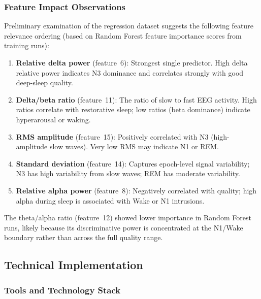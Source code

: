 \documentclass[10pt]{article}
\begin{document}
\subsubsection{Feature Impact Observations}
\label{sec:featureImpact}

Preliminary examination of the regression dataset suggests the following feature relevance ordering (based on Random Forest feature importance scores from training runs):

\begin{enumerate}
  \item \textbf{Relative delta power} (feature~6): Strongest single predictor. High delta relative power indicates N3 dominance and correlates strongly with good deep-sleep quality.
  \item \textbf{Delta/beta ratio} (feature~11): The ratio of slow to fast EEG activity. High ratios correlate with restorative sleep; low ratios (beta dominance) indicate hyperarousal or waking.
  \item \textbf{RMS amplitude} (feature~15): Positively correlated with N3 (high-amplitude slow waves). Very low RMS may indicate N1 or REM.
  \item \textbf{Standard deviation} (feature~14): Captures epoch-level signal variability; N3 has high variability from slow waves; REM has moderate variability.
  \item \textbf{Relative alpha power} (feature~8): Negatively correlated with quality; high alpha during sleep is associated with Wake or N1 intrusions.
\end{enumerate}

The theta/alpha ratio (feature~12) showed lower importance in Random Forest runs, likely because its discriminative power is concentrated at the N1/Wake boundary rather than across the full quality range.

\subsection{Technical Implementation}
\label{sec:technicalImplementation}

\subsubsection{Tools and Technology Stack}
\label{sec:toolsStack}
\end{document}
